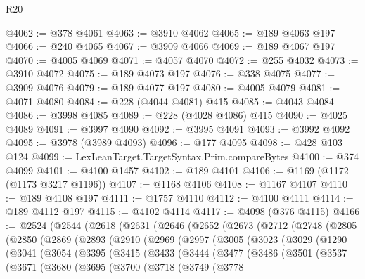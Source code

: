 \begin{lexlean}{R20}
\begin{coremodule}
@4062 := @378 @4061
@4063 := @3910 @4062
@4065 := @189 @4063 @197
@4066 := @240 @4065
@4067 := @3909 @4066
@4069 := @189 @4067 @197
@4070 := @4005 @4069
@4071 := @4057 @4070
@4072 := @255 @4032
@4073 := @3910 @4072
@4075 := @189 @4073 @197
@4076 := @338 @4075
@4077 := @3909 @4076
@4079 := @189 @4077 @197
@4080 := @4005 @4079
@4081 := @4071 @4080
@4084 := @228 (@4044 @4081) @415
@4085 := @4043 @4084
@4086 := @3998 @4085
@4089 := @228 (@4028 @4086) @415
@4090 := @4025 @4089
@4091 := @3997 @4090
@4092 := @3995 @4091
@4093 := @3992 @4092
@4095 := @3978 (@3989 @4093)
@4096 := @177 @4095
@4098 := @428 @103 @124
@4099 := LexLeanTarget.TargetSyntax.Prim.compareBytes
@4100 := @374 @4099
@4101 := @4100 @1457
@4102 := @189 @4101
@4106 := @1169 (@1172 (@1173 @3217 @1196))
@4107 := @1168 @4106
@4108 := @1167 @4107
@4110 := @189 @4108 @197
@4111 := @1757 @4110
@4112 := @4100 @4111
@4114 := @189 @4112 @197
@4115 := @4102 @4114
@4117 := @4098 (@376 @4115)
@4166 := @2524
    (@2544
      (@2618
        (@2631
          (@2646
            (@2652
              (@2673
                (@2712
                  (@2748
                    (@2805
                      (@2850
                        (@2869
                          (@2893
                            (@2910
                              (@2969
                                (@2997
                                  (@3005
                                    (@3023
                                      (@3029
                                        (@1290
                                          (@3041
                                            (@3054
                                              (@3395
                                                (@3415
                                                  (@3433
                                                    (@3444
                                                      (@3477
                                                        (@3486
                                                          (@3501
                                                            (@3537
                                                              (@3671
                                                                (@3680
                                                                  (@3695
                                                                    (@3700
                                                                      (@3718
                                                                        (@3749
                                                                          (@3778

\end{coremodule}
\end{lexlean}
